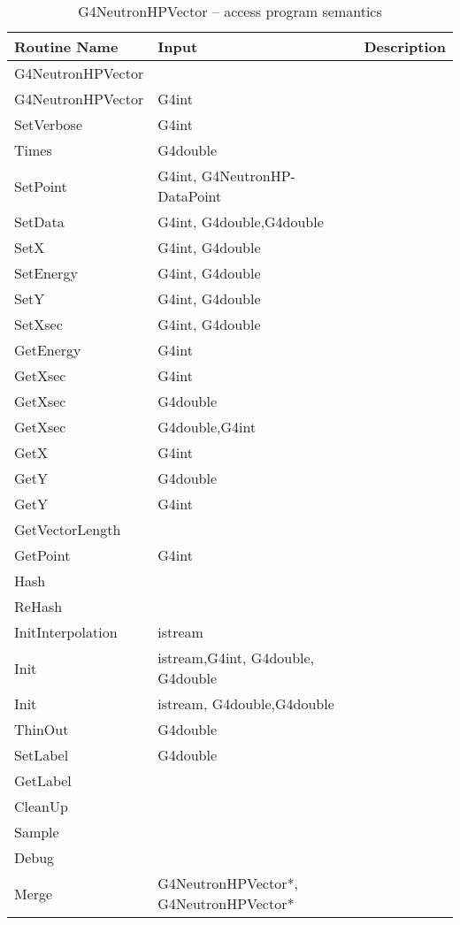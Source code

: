 \documentclass[12pt]{article}
\begin{document}
\begin{longtable}{p{}p{}p{}}
\caption{G4NeutronHPVector -- access program semantics}\label{Table_NeutronHPVectorSemantics}\\
\toprule
\bf Routine Name & \bf Input & \bf Description \\\midrule
\arrayrulecolor{lightgray}
G4NeutronHPVector & & \\\hline
G4NeutronHPVector & G4int & \\\hline
SetVerbose & G4int & \\\hline
Times & G4double & \\\hline
SetPoint & G4int, G4NeutronHP-DataPoint & \\\hline
SetData & G4int, G4double,G4double & \\\hline
SetX & G4int, G4double & \\\hline
SetEnergy & G4int, G4double & \\\hline
SetY & G4int, G4double & \\\hline
SetXsec & G4int, G4double & \\\hline
GetEnergy & G4int & \\\hline
GetXsec & G4int & \\\hline
GetXsec & G4double & \\\hline
GetXsec & G4double,G4int & \\\hline
GetX & G4int & \\\hline
GetY & G4double & \\\hline
GetY & G4int & \\\hline
GetVectorLength & & \\\hline
GetPoint & G4int & \\\hline
Hash & & \\\hline
ReHash & & \\\hline
InitInterpolation & istream & \\\hline
Init & istream,G4int, G4double, G4double & \\\hline
Init & istream, G4double,G4double & \\\hline
ThinOut & G4double & \\\hline
SetLabel & G4double & \\\hline
GetLabel & & \\\hline
CleanUp & & \\\hline
Sample & & \\\hline
Debug & & \\\hline
Merge & G4NeutronHPVector*,  G4NeutronHPVector* & \\\hline

\end{longtable}
\end{document}
